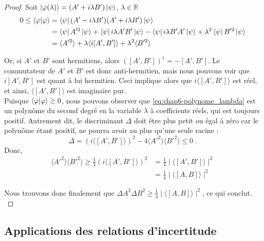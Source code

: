 \documentclass[../notesdecours]{subfiles}
\begin{document}
\begin{proof}
    Soit $\ket{\varphi(\lambda)} = (A' + i \lambda B')\ket{\psi}$, $\lambda \in \mathbb{R}$ \\
    \begin{align}
        0 \leq \braket{\varphi | \varphi} &= \bra{\psi} (A' - i\lambda B')(A' +i\lambda B') \ket{\psi} \notag \\
        &= \bra{\psi} A'^2 \ket{\psi} + \bra{\psi} i\lambda A'B' \ket{\psi} - \bra{\psi} i\lambda B'A' \ket{\psi} + \lambda^2 \bra{\psi} B'^2 \ket{\psi} \notag \\
        &= \langle A'^2 \rangle + \lambda \langle i [A', B'] \rangle + \lambda^2 \langle B'^2 \rangle 
        \label{eq:chap6-polynome_lambda}
    \end{align}

    Or, si $A'$ et $B'$ sont hermitiens, alors $ \left( [A', B'] \right)^\dagger = - [A', B']$. Le commutateur de $A'$ et $B'$ est donc anti-hermitien, mais nous pouvons voir que $i [A', B']$ est quant à lui hermitien. Ceci implique alors que $i \langle [A', B'] \rangle$ est réel, et ainsi, $\langle [A',B'] \rangle$ est imaginaire pur. \\

    Puisque $\braket{\varphi | \varphi} \geq 0$, nous pouvons observer que \eqref{eq:chap6-polynome_lambda} est un polynôme du second degré en la variable $\lambda$ à coefficients réels, qui est toujours positif. Autrement dit, le discriminant $\Delta$ doit être plus petit ou égal à zéro car le polynôme étant positif, ne pourra avoir au plus qu'une seule racine : 
    $$ \Delta = \left( i \langle [A', B'] \rangle \right)^2 - 4 \langle A'^2 \rangle \langle B'^2 \rangle \leq 0\; .$$
     Donc, 
    \begin{align*}
        \langle A'^2 \rangle \langle B'^2 \rangle \geq \frac{1}{4} \left( i \langle [A', B'] \rangle \right)^2 &= \frac{1}{4} \mid \langle [A',B'] \rangle \mid^2 \\
        &= \frac{1}{4} \mid \langle [A,B] \rangle \mid^2 
    \end{align*}

    Nous trouvons donc finalement que $\Delta A^2 \Delta B^2 \geq \frac{1}{4} \mid \langle [A, B] \rangle \mid^2$, ce qui conclut. \\
\end{proof}

\subsection{Applications des relations d'incertitude}
\end{document}
